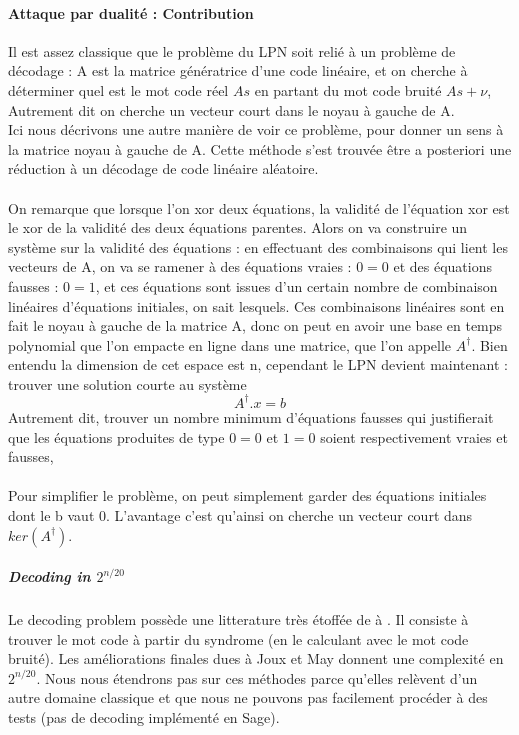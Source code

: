\documentclass{article}		%
\theoremstyle{definition}
\theoremstyle{plain}
\begin{document}
\paragraph{Attaque par dualité : Contribution }
Il est assez classique que le problème du LPN soit relié à un problème de
décodage : A est la matrice génératrice d'une code linéaire, et on
cherche à déterminer quel est le mot code réel $As$ en partant du mot code
bruité $As+\nu$, Autrement dit on cherche un vecteur court dans le noyau à
gauche de A.
\\
 Ici nous décrivons une autre manière de voir ce
problème, pour donner un sens à la matrice noyau à gauche de A. Cette
méthode s'est trouvée être a posteriori une réduction à un décodage de
code linéaire aléatoire.
\\\\
\label{SVP} 
On remarque que lorsque l'on xor deux équations, la validité de
l'équation xor est le xor de la validité des deux équations parentes.
Alors on va construire un système sur la validité des équations : en
effectuant des combinaisons qui lient les vecteurs de A, on va se ramener
à des équations vraies : $0=0$ et des équations fausses : $0=1$, et ces
équations sont issues d'un certain nombre de combinaison linéaires
d'équations initiales, on sait lesquels. Ces combinaisons linéaires sont en
fait le noyau à gauche de la matrice A, donc on peut en avoir une base en
temps polynomial que l'on empacte en ligne dans une matrice, que l'on
appelle $A^\dagger$. Bien entendu la dimension de cet espace est n,
cependant le LPN devient maintenant : trouver une solution courte au
système  $$A^\dagger.x=b$$ Autrement dit, trouver un nombre minimum
d'équations fausses qui justifierait que les équations produites de type $0=0$ et
$1=0$ soient respectivement vraies et fausses, \\\\
Pour simplifier le problème, on peut simplement garder des équations initiales dont le b vaut 0. 
L'avantage c'est qu'ainsi on cherche un
vecteur court dans $ker(A^\dagger)$. 


\subparagraph{Decoding in $2^{n/20}$} 
Le decoding problem possède une litterature très étoffée de \cite{Stern}
à \cite{Joux}. Il consiste à trouver le mot code à partir du syndrome (en
le calculant avec le mot code bruité). Les améliorations finales dues à
Joux et May donnent une complexité en $2^{n/20}$. Nous nous étendrons
pas sur ces méthodes parce qu'elles relèvent d'un autre domaine classique
et que nous ne pouvons pas facilement procéder à des tests (pas de
decoding implémenté en Sage).
\end{document}
